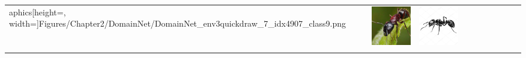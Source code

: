 \begin{table}[htbp]
\begin{tabularx}{\textwidth}{lcYYYYYYYY}
aphics[height=\imagequadsize, width=\imagequadsize]{Figures/Chapter2/DomainNet/DomainNet_env3quickdraw_7_idx4907_class9.png} & \includegraphics[height=\imagequadsize, width=\imagequadsize]{Figures/Chapter2/DomainNet/DomainNet_env4real_34_idx3532_class9.png} & \includegraphics[height=\imagequadsize, width=\imagequadsize]{Figures/Chapter2/DomainNet/DomainNet_env5sketch_0_idx1772_class9.png}  & & \\
       \addlinespace
        &  &  &  &  &  & &  & & \\

\end{tabularx}
\end{table}
